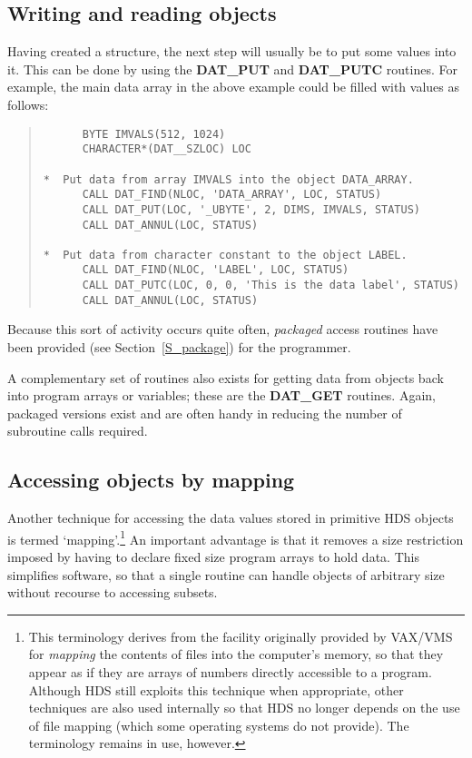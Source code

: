\subsection{Writing and reading objects}

Having created a structure, the next step will usually be to put some values
into it.
This can be done by using the {\bf DAT\_PUT} and {\bf DAT\_PUTC} routines.
For example, the main data array in the above example could be filled with
values as follows:

\begin{quote}

\begin{small}
\begin{verbatim}
      BYTE IMVALS(512, 1024)
      CHARACTER*(DAT__SZLOC) LOC

*  Put data from array IMVALS into the object DATA_ARRAY.
      CALL DAT_FIND(NLOC, 'DATA_ARRAY', LOC, STATUS)
      CALL DAT_PUT(LOC, '_UBYTE', 2, DIMS, IMVALS, STATUS)
      CALL DAT_ANNUL(LOC, STATUS)

*  Put data from character constant to the object LABEL.
      CALL DAT_FIND(NLOC, 'LABEL', LOC, STATUS)
      CALL DAT_PUTC(LOC, 0, 0, 'This is the data label', STATUS)
      CALL DAT_ANNUL(LOC, STATUS)
\end{verbatim}
\end{small}

\end{quote}
Because this sort of activity occurs quite often, {\em packaged} access routines
have been provided (see Section~\ref{S_package}) for the programmer.

A complementary set of routines also exists for getting data from objects back
into program arrays or variables; these are the {\bf DAT\_GET} routines.
Again, packaged versions exist and are often handy in reducing the number of
subroutine calls required.

\subsection{Accessing objects by mapping}
\label{S_mapping}

Another technique for accessing the data values stored in primitive HDS objects
is termed `mapping'.\footnote{This terminology derives from the facility
originally provided by VAX/VMS for {\em mapping} the contents of files into the
computer's memory, so that they appear as if they are arrays of numbers
directly accessible to a program.
Although HDS still exploits this technique when appropriate, other techniques
are also used internally so that HDS no longer depends on the use of file
mapping (which some operating systems do not provide).
The terminology remains in use, however.}
An important advantage is that it removes a size restriction imposed by having
to declare fixed size program arrays to hold data.
This simplifies software, so that a single routine can handle objects of
arbitrary size without recourse to accessing subsets.

